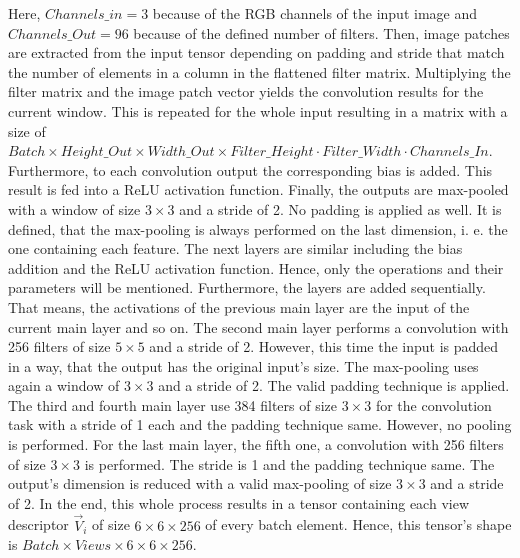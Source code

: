 Here, $Channels\_in = 3$ because of the RGB channels of the input image and $Channels\_Out = 96$ because of the defined number of filters.
Then, image patches are extracted from the input tensor depending on padding and stride that match the number of elements in a column in the flattened filter matrix.
Multiplying the filter matrix and the image patch vector yields the convolution results for the current window.
This is repeated for the whole input resulting in a matrix with a size of $Batch \times Height\_Out \times Width\_Out \times Filter\_Height \cdot Filter\_Width \cdot Channels\_In$.
Furthermore, to each convolution output the corresponding bias is added.
This result is fed into a ReLU activation function.
Finally, the outputs are max-pooled with a window of size $3 \times 3$ and a stride of 2.
No padding is applied as well.
It is defined, that the max-pooling is always performed on the last dimension, i. e. the one containing each feature.
The next layers are similar including the bias addition and the ReLU activation function.
Hence, only the operations and their parameters will be mentioned.
Furthermore, the layers are added sequentially.
That means, the activations of the previous main layer are the input of the current main layer and so on.
The second main layer performs a convolution with 256 filters of size $5 \times 5$ and a stride of 2.
However, this time the input is padded in a way, that the output has the original input's size.
The max-pooling uses again a window of $3 \times 3$ and a stride of 2.
The valid padding technique is applied.
The third and fourth main layer use 384 filters of size $3 \times 3$ for the convolution task with a stride of 1 each and the padding technique same.
However, no pooling is performed.
For the last main layer, the fifth one, a convolution with 256 filters of size $3 \times 3$ is performed.
The stride is 1 and the padding technique same.
The output's dimension is reduced with a valid max-pooling of size $3 \times 3$ and a stride of 2.
In the end, this whole process results in a tensor containing each view descriptor $\vec{V}_i$ of size $6 \times 6 \times 256$ of every batch element.
Hence, this tensor's shape is $Batch \times Views \times 6 \times 6 \times 256$.